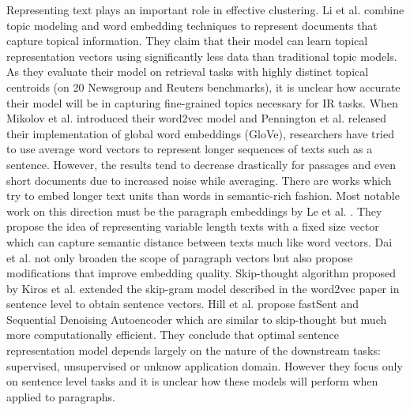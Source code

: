 Representing text plays an important role in effective clustering. Li et al. \cite{li2016generative} combine topic modeling and word embedding techniques to represent documents that capture topical information. They claim that their model can learn topical representation vectors using significantly less data than traditional topic models. As they evaluate their model on retrieval tasks with highly distinct topical centroids (on 20 Newsgroup and Reuters benchmarks), it is unclear how accurate their model will be in capturing fine-grained topics necessary for IR tasks. When Mikolov et al. \cite{mikolov2013distributed} introduced their word2vec model and Pennington et al. \cite{pennington2014glove} released their implementation of global word embeddings (GloVe), researchers have tried to use average word vectors to represent longer sequences of texts such as a sentence. However, the results tend to decrease drastically for passages and even short documents due to increased noise while averaging. There are works which try to embed longer text units than words in semantic-rich fashion. Most notable work on this direction must be the paragraph embeddings by Le et al. \cite{le2014distributed}. They propose the idea of representing variable length texts with a fixed size vector which can capture semantic distance between texts much like word vectors. Dai et al. \cite{dai2015document} not only broaden the scope of paragraph vectors but also propose modifications that improve embedding quality. Skip-thought algorithm proposed by Kiros et al. \cite{kiros2015skip} extended the skip-gram model described in the word2vec paper in sentence level to obtain sentence vectors. Hill et al. \cite{hill2016learning} propose fastSent and Sequential Denoising Autoencoder which are similar to skip-thought but much more computationally efficient. They conclude that optimal sentence representation model depends largely on the nature of the downstream tasks: supervised, unsupervised or unknow  application domain. However they focus only on sentence level tasks and it is unclear how these models will perform when applied to paragraphs.